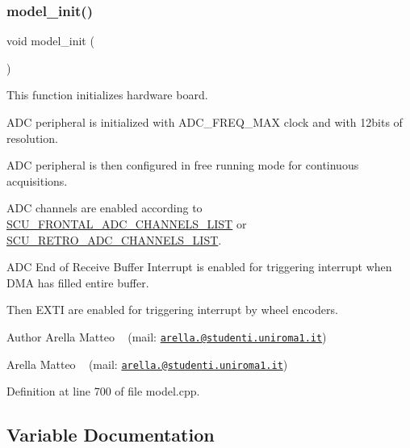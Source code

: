 \subsubsection{\texorpdfstring{model\+\_\+init()}{model\_init()}}
{\footnotesize\ttfamily void model\+\_\+init (\begin{DoxyParamCaption}{ }\end{DoxyParamCaption})}



This function initializes hardware board. 

A\+DC peripheral is initialized with A\+D\+C\+\_\+\+F\+R\+E\+Q\+\_\+\+M\+AX clock and with 12bits of resolution.

A\+DC peripheral is then configured in free running mode for continuous acquisitions.

A\+DC channels are enabled according to \mbox{\hyperlink{group___board__model__group_ga1b36d02d5fef3342ea7159722fa50ff3}{S\+C\+U\+\_\+\+F\+R\+O\+N\+T\+A\+L\+\_\+\+A\+D\+C\+\_\+\+C\+H\+A\+N\+N\+E\+L\+S\+\_\+\+L\+I\+ST}} or \mbox{\hyperlink{group___board__model__group_ga5190c5da456959fb6c7132518a51f12f}{S\+C\+U\+\_\+\+R\+E\+T\+R\+O\+\_\+\+A\+D\+C\+\_\+\+C\+H\+A\+N\+N\+E\+L\+S\+\_\+\+L\+I\+ST}}.

A\+DC End of Receive Buffer Interrupt is enabled for triggering interrupt when D\+MA has filled entire buffer.

Then E\+X\+TI are enabled for triggering interrupt by wheel encoders.

\begin{DoxyAuthor}{Author}
Arella Matteo ~\newline
 (mail\+: \href{mailto:arella.1646983@studenti.uniroma1.it}{\tt arella.@studenti.\+uniroma1.\+it})

Arella Matteo ~\newline
 (mail\+: \href{mailto:arella.1646983@studenti.uniroma1.it}{\tt arella.@studenti.\+uniroma1.\+it}) 
\end{DoxyAuthor}


Definition at line 700 of file model.\+cpp.



\subsection{Variable Documentation}
\mbox{\label{group___board__model__group_gaa9de48f5a49bc92a608ed315c087f3a6}} 
